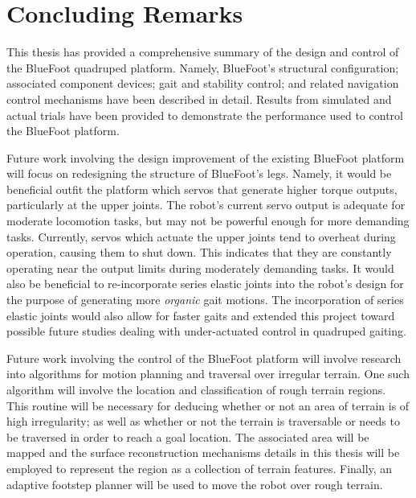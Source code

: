 \chapter{Concluding Remarks}

This thesis has provided a comprehensive summary of the design and control of the BlueFoot quadruped platform. Namely, BlueFoot's structural configuration; associated component devices; gait and stability control; and related navigation control mechanisms have been described in detail. Results from simulated and actual trials have been provided to demonstrate the performance used to control the BlueFoot platform.

Future work involving the design improvement of the existing BlueFoot platform will focus on redesigning the structure of BlueFoot's legs. Namely, it would be beneficial outfit the platform which servos that generate higher torque outputs, particularly at the upper joints. The robot's current servo output is adequate for moderate locomotion tasks, but may not be powerful enough for more demanding tasks. Currently, servos which actuate the upper joints tend to overheat during operation, causing them to shut down. This indicates that they are constantly operating near the output limits during moderately demanding tasks. It would also be beneficial to re-incorporate series elastic joints into the robot's design for the purpose of generating more \emph{organic} gait motions. The incorporation of series elastic joints would also allow for faster gaits and extended this project toward possible future studies dealing with under-actuated control in quadruped gaiting.

Future work involving the control of the BlueFoot platform will involve research into algorithms for motion planning and traversal over irregular terrain.  One such algorithm will involve the location and classification of rough terrain regions. This routine will be necessary for deducing whether or not an area of terrain is of high irregularity; as well as whether or not the terrain is traversable or needs to be traversed in order to reach a goal location. The associated area will be mapped and the surface reconstruction mechanisms details in this thesis will be employed to represent the region as a collection of terrain features. Finally, an adaptive footstep planner will be used to move the robot over rough terrain. 

